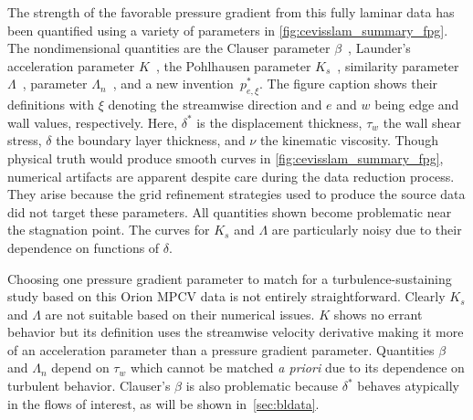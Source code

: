The strength of the favorable pressure gradient from this
fully laminar data has been quantified using a variety of
parameters in \autoref{fig:cevisslam_summary_fpg}.
The nondimensional quantities are the Clauser parameter
$\beta$~\citep{Clauser1954Turbulent}, Launder's acceleration parameter
$K$~\citep{Launder1964Laminarization}, the Pohlhausen parameter $K_s$~\citep{Pohlhausen1921Zur},
similarity parameter $\Lambda$~\citep{Cal2008Similarity}, parameter
$\Lambda_n$~\citep{Narasimha1979Relaminarization}, and a new
invention~$p_{e,\xi}^{\ast}$.  The figure caption shows their definitions
with $\xi$ denoting the streamwise direction and $e$ and $w$ being edge
and wall values, respectively.  Here, $\delta^\ast$ is the displacement
thickness, $\tau_w$ the wall shear stress, $\delta$ the boundary layer
thickness, and $\nu$ the kinematic viscosity.  Though physical truth would
produce smooth curves in \autoref{fig:cevisslam_summary_fpg}, numerical
artifacts are apparent despite care during the data reduction process.
They arise because the grid refinement strategies used to produce the
source data did not target these parameters.  All quantities shown become
problematic near the stagnation point.  The curves for $K_s$ and $\Lambda$
are particularly noisy due to their dependence on functions of $\delta$.

Choosing one pressure gradient parameter to match for
a turbulence-sustaining study based on this Orion MPCV data is
not entirely straightforward.  Clearly $K_s$ and $\Lambda$ are not
suitable based on their numerical issues.  $K$ shows no errant behavior
but its definition uses the streamwise velocity derivative making it
more of an acceleration parameter than a pressure gradient parameter.
%
%
Quantities $\beta$ and
$\Lambda_n$ depend on $\tau_w$ which cannot be matched \emph{a priori}
due to its dependence on turbulent behavior.  Clauser's $\beta$ is also
problematic because $\delta^\ast$ behaves atypically in the
flows of interest, as will be shown in~\autoref{sec:bldata}.

